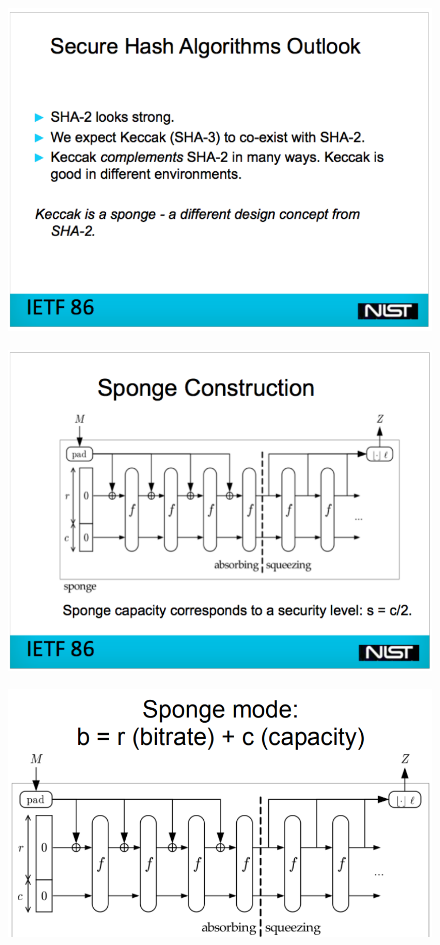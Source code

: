 \documentclass[openany]{book}
\begin{document}
\newpage

\begin{figure}[h!]
    \centering
    \includegraphics[width=0.9\linewidth]{Pics/Hashing6.PNG}
\end{figure}

\begin{figure}[h!]
    \centering
    \includegraphics[width=0.9\linewidth]{Pics/Hashing7.PNG}
\end{figure} 

\newpage

\begin{figure}[h!]
    \centering
    \includegraphics[width=\linewidth]{Pics/Hashing8.PNG}
\end{figure} 
\end{document}
